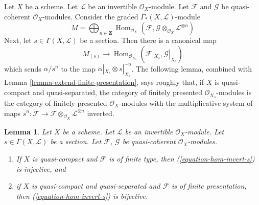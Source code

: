 \documentclass{stacks-project}
\theoremstyle{plain}
\newtheorem{lemma}[subsection]{Lemma}
\theoremstyle{definition}
\theoremstyle{remark}
\numberwithin{equation}{subsection}
\def\Hom{\mathop{\mathrm{Hom}}\nolimits}
\begin{document}
\noindent
Let $X$ be a scheme. Let $\mathcal{L}$ be an invertible $\mathcal{O}_X$-module.
Let $\mathcal{F}$ and $\mathcal{G}$ be quasi-coherent $\mathcal{O}_X$-modules.
Consider the graded $\Gamma_*(X, \mathcal{L})$-module
$$
M = \bigoplus\nolimits_{n \in \mathbf{Z}} \Hom_{\mathcal{O}_X}(\mathcal{F},
\mathcal{G} \otimes_{\mathcal{O}_X} \mathcal{L}^{\otimes n})
$$
Next, let $s \in \Gamma(X, \mathcal{L})$ be a section. Then there is a
canonical map
\begin{equation}
\label{equation-hom-invert-s}
M_{(s)} \longrightarrow
\Hom_{\mathcal{O}_{X_s}}(\mathcal{F}|_{X_s}, \mathcal{G}|_{X_s})
\end{equation}
which sends $\alpha/s^n$ to the map $\alpha|_{X_s} \otimes s|_{X_s}^{-n}$.
The following lemma, combined with
Lemma \ref{lemma-extend-finite-presentation},
says roughly that, if $X$ is quasi-compact and quasi-separated,
the category of finitely presented $\mathcal{O}_{X_s}$-modules
is the category of finitely presented $\mathcal{O}_X$-modules
with the multiplicative system of maps
$s^n: \mathcal{F} \to
\mathcal{F} \otimes_{\mathcal{O}_X} \mathcal{L}^{\otimes n}$ inverted.

\begin{lemma}
\label{lemma-section-maps-backwards}
Let $X$ be a scheme. Let $\mathcal{L}$ be an invertible $\mathcal{O}_X$-module.
Let $s \in \Gamma(X, \mathcal{L})$ be a section.
Let $\mathcal{F}$, $\mathcal{G}$ be quasi-coherent $\mathcal{O}_X$-modules.
\begin{enumerate}
\item If $X$ is quasi-compact and $\mathcal{F}$ is of finite type,
then (\ref{equation-hom-invert-s}) is injective, and
\item if $X$ is quasi-compact and quasi-separated and $\mathcal{F}$
is of finite presentation, then
(\ref{equation-hom-invert-s})
is bijective.
\end{enumerate}
\end{lemma}
\end{document}
